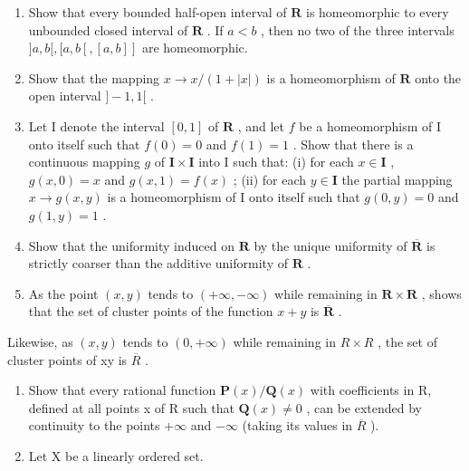 \BourbakiExerciseGroup

\begin{enumerate}
\def\labelenumi{\arabic{enumi})}
\item
  Show that every bounded half-open interval of \(\mathbf{R}\) is homeomorphic to every unbounded closed interval of \(\mathbf{R}\) . If \(a < b\) , then no two of the three intervals \(]a, b[, [a, b[, [a, b]]\) are homeomorphic.
\item
  Show that the mapping \(x \to x / (1 + |x|)\) is a homeomorphism of \(\mathbf{R}\) onto the open interval \(] - 1, 1[\) .
\item
  Let I denote the interval \([0, 1]\) of \(\mathbf{R}\) , and let \(f\) be a homeomorphism of I onto itself such that \(f(0) = 0\) and \(f(1) = 1\) . Show that there is a continuous mapping \(g\) of \(\mathbf{I} \times \mathbf{I}\) into I such that: (i) for each \(x \in \mathbf{I}\) , \(g(x, 0) = x\) and \(g(x, 1) = f(x)\) ; (ii) for each \(y \in \mathbf{I}\) the partial mapping \(x \to g(x, y)\) is a homeomorphism of I onto itself such that \(g(0, y) = 0\) and \(g(1, y) = 1\) .
\item
  Show that the uniformity induced on \(\mathbf{R}\) by the unique uniformity of \(\overline{\mathbf{R}}\) is strictly coarser than the additive uniformity of \(\mathbf{R}\) .
\item
  As the point \((x, y)\) tends to \((+\infty, -\infty)\) while remaining in \(\mathbf{R} \times \mathbf{R}\) , shows that the set of cluster points of the function \(x + y\) is \(\overline{\mathbf{R}}\) .
\end{enumerate}

Likewise, as \((x,y)\) tends to \((0,+\infty)\) while remaining in \(R\times R\) , the set of cluster points of xy is \(\overline{R}\) .

\begin{enumerate}
\def\labelenumi{\arabic{enumi})}
\setcounter{enumi}{5}
\item
  Show that every rational function \(\mathbf{P}(x)/\mathbf{Q}(x)\) with coefficients in R, defined at all points x of R such that \(\mathbf{Q}(x)\neq0\) , can be extended by continuity to the points \(+\infty\) and \(-\infty\) (taking its values in \(\overline{R}\) ).
\item
  Let X be a linearly ordered set.
\end{enumerate}

